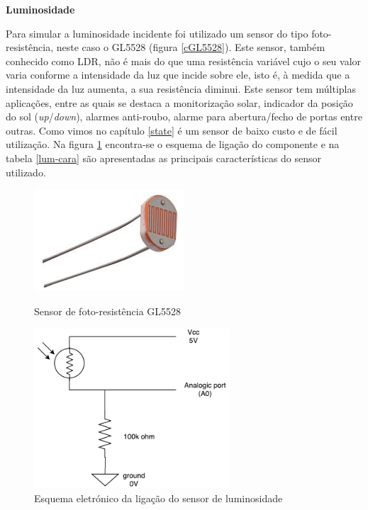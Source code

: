 \textbf{Luminosidade}



Para simular a luminosidade incidente foi utilizado um sensor do tipo foto-resistência, neste caso o GL5528 (figura \ref{cGL5528}). Este sensor, também conhecido como \ac{LDR}, não é mais do que uma resistência variável cujo o seu valor varia conforme a intensidade da luz que incide sobre ele, isto é, à medida que a intensidade da luz aumenta, a sua resistência diminui. Este sensor tem múltiplas aplicações, entre as quais se destaca a monitorização solar, indicador da posição do sol (\textit{up}/\textit{down}), alarmes anti-roubo, alarme para abertura/fecho de portas entre outras. Como vimos no capítulo \ref{state} é um sensor de baixo custo e de fácil utilização. Na figura \ref{lum-esquema} encontra-se o esquema de ligação do componente e na tabela \ref{lum-cara} são apresentadas as principais características do sensor utilizado. 







\begin{figure}[h]
	\centering
	\begin{minipage}[b]{0.49\textwidth}
		\centering
		\includegraphics[width=0.5\textwidth]{img/hardware/luminosidade.png}
		\caption{Sensor de foto-resistência GL5528}
		\label{cGL5528}
	\end{minipage}
	\hfill
	\begin{minipage}[b]{0.49\textwidth}
		\centering
		\includegraphics[width=0.65\textwidth]{img/hardware/lumi_esquema.pdf}
		\caption{Esquema eletrónico da ligação do sensor de luminosidade}
		\label{lum-esquema}
	\end{minipage}
\end{figure}







